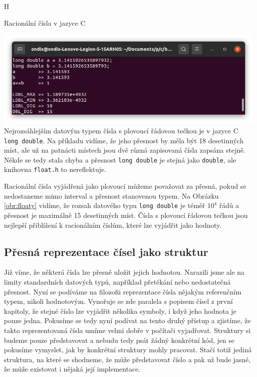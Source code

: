 \begin{myfigure}{H}
\caption{Racionální čísla v jazyce C}
\includegraphics[width=\linewidth]{./graphics/floaty.png}\label{obr:floaty}
Nejrozsáhlejším datovým typem čísla s plovoucí řádovou tečkou je v jazyce C \texttt{long double}. Na příkladu vidíme, že jeho přesnost by měla být 18 desetinných míst, ale už na patnácti místech jsou dvě různá zapisovaná čísla zapsána stejně. Někde se tedy stala chyba a přesnost \texttt{long double} je stejná jako \texttt{double}, ale knihovna \texttt{float.h} to nereflektuje.
\end{myfigure}

Racionální čísla vyjádřená jako plovoucí můžeme považovat za přesná, pokud se nedostaneme mimo interval a přesnost stanovenou typem. Na Obrázku \ref{obr:floaty} vidíme, že rozsah datového typu \texttt{long double} je téměř $10^4$ řádů a přesnost je maximálně 15 desetinných míst. Čísla s plovoucí řádovou tečkou jsou nejlepší přiblížení k racionálním číslům, které lze vyjádřit jako hodnoty.
\subsection{Přesná reprezentace čísel jako struktur}
Již víme, že některá čísla lze přesně uložit jejich hodnotou. Narazili jsme ale na limity standardních datových typů, například přetékání nebo nedostatečná přesnost. Nyní se podíváme na filozofii reprezentace čísla nějakým referenčním typem, nikoli hodnotovým. Vynořuje se zde paralela s popisem čísel z první kapitoly, že stejné číslo lze vyjádřit několika symboly, i když jeho hodnota je pouze jedna. Pokusíme se tedy nyní podívat na tento druhý přístup a zjistíme, že takto reprezentovaná čísla umíme velmi dobře v počítači vyjadřovat. Struktury si budeme pouze představovat a nebudu tedy psát žádný konkrétní kód, jen se pokusíme vymyslet, jak by konkrétní struktury mohly pracovat. Stačí totiž jediná struktura, na které se shodneme, že může představovat číslo a pak už bude jasné, že může existovat i nějaká její implementace.

